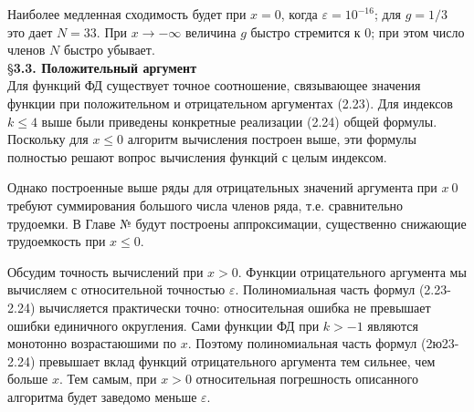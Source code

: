 Наиболее медленная сходимость будет при $x = 0$, когда $\varepsilon = 10^{-16}$; для
$g = 1/3$ это дает $N = 33$. При $x \to -\infty$ величина $g$ быстро стремится к $0$; при
этом число членов $N$ быстро убывает.
\\

\S \textbf{3.3. Положительный аргумент}
\\

Для функций ФД существует точное соотношение, связывающее значения функции при положительном и
отрицательном аргументах (2.23). Для индексов $k \leqslant 4$ выше были приведены конкретные реализации (2.24) общей формулы. Поскольку для $x \leqslant 0$ алгоритм вычисления построен выше, эти формулы полностью решают вопрос вычисления функций с целым индексом.

Однако построенные выше ряды для отрицательных значений аргумента при $x~0$ требуют суммирования большого числа членов ряда, т.е. сравнительно трудоемки. В Главе № будут построены аппроксимации, существенно снижающие трудоемкость при $x \leqslant 0$.

Обсудим точность вычислений при $x > 0$. Функции отрицательного аргумента мы вычисляем с относительной точностью $\varepsilon$. Полиномиальная часть формул (2.23-2.24) вычисляется практически точно: относительная ошибка не превышает ошибки единичного округления. Сами функции ФД при $k > -1$ являются монотонно возрастаюшими по $x$. Поэтому полиномиальная часть формул (2ю23-2.24) превышает вклад функций отрицательного аргумента тем сильнее, чем больше $x$. Тем самым, при $x>0$ относительная погрешность описанного алгоритма будет заведомо меньше $\varepsilon$.
\\
